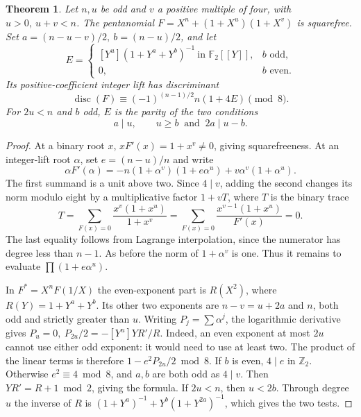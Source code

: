 \documentclass[11pt]{article}
\newtheorem{theorem}{Theorem}
\newcommand{\F}{\mathbb F_2}
\begin{document}
\begin{theorem}\label{thm:product-parity-sector}
Let \(n,u\) be odd and \(v\) a positive multiple of four, with
\(u>0,\ u+v<n\). The pentanomial \(F=X^n+(1+X^u)(1+X^v)\)
is squarefree. Set \(a=(n-u-v)/2,\ b=(n-u)/2\), and let
\[
 E=\begin{cases}
 [Y^u](1+Y^a+Y^b)^{-1}\ \text{in }\F[[Y]],& b\text{ odd},\\
 0,& b\text{ even}.
 \end{cases}
\]
Its positive-coefficient integer lift has discriminant
\[
 \operatorname{disc}(F)\equiv(-1)^{(n-1)/2}n(1+4E)\pmod8 .
\]
For \(2u<n\) and \(b\) odd, \(E\) is the parity of the two conditions
\[
 a\mid u,\qquad u\ge b\ \text{ and }\ 2a\mid u-b .
\]
\end{theorem}
\begin{proof}
At a binary root \(x\), \(xF'(x)=1+x^v\ne0\), giving squarefreeness.
At an integer-lift root \(\alpha\), set \(e=(n-u)/n\) and write
\[
 \alpha F'(\alpha)=-n(1+\alpha^v)(1+e\alpha^u)
                     +v\alpha^v(1+\alpha^u).
\]
The first summand is a unit above two. Since \(4\mid v\), adding the
second changes its norm modulo eight by a multiplicative factor
\(1+vT\), where \(T\) is the binary trace
\[
 T=\sum_{F(x)=0}\frac{x^v(1+x^u)}{1+x^v}
   =\sum_{F(x)=0}\frac{x^{v-1}(1+x^u)}{F'(x)}=0 .
\]
The last equality follows from Lagrange interpolation, since the
numerator has degree less than \(n-1\). As before the norm of
\(1+\alpha^v\) is one. Thus it remains to evaluate
\(\prod(1+e\alpha^u)\).

In \(F^*=X^nF(1/X)\) the even-exponent part is \(R(X^2)\), where
\(R(Y)=1+Y^a+Y^b\). Its other two exponents are \(n-v=u+2a\)
and \(n\), both odd and strictly greater than \(u\).
Writing \(P_j=\sum\alpha^j\), the logarithmic derivative gives
\(P_u=0,\ P_{2u}/2=-[Y^u]YR'/R\). Indeed, an even exponent at most
\(2u\) cannot use either odd exponent: it would need to use at least
two. The product of the linear terms is therefore
\(1-e^2 P_{2u}/2\bmod8\). If \(b\) is even, \(4\mid e\) in
\(\mathbb Z_2\). Otherwise \(e^2\equiv4\bmod8\), and \(a,b\) are both
odd as \(4\mid v\). Then \(YR'=R+1\bmod2\), giving the formula.
If \(2u<n\), then \(u<2b\). Through degree \(u\) the inverse of \(R\)
is \((1+Y^a)^{-1}+Y^b(1+Y^{2a})^{-1}\), which gives the two tests.
\end{proof}
\end{document}
